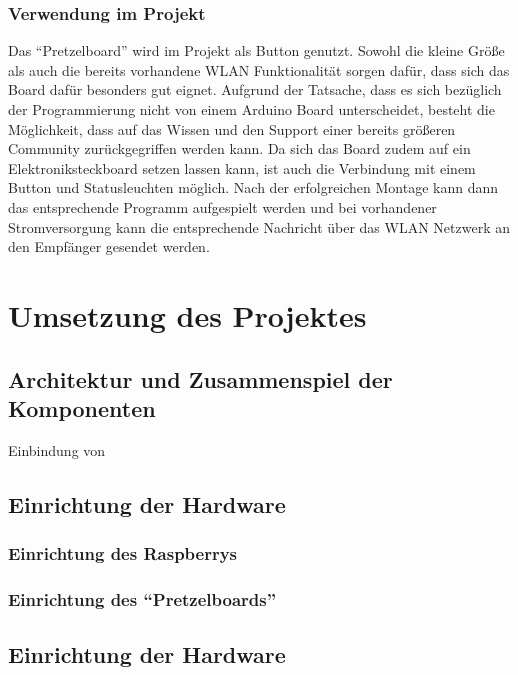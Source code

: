 \documentclass[ngerman]{scrartcl} %
\begin{document}
\subsubsection{Verwendung im Projekt}        
\label{sec:Verwendung des ``Pretzelboard''} 
Das ``Pretzelboard'' wird im Projekt als Button genutzt. Sowohl die kleine Größe als auch die bereits vorhandene WLAN Funktionalität sorgen dafür, dass sich das Board dafür besonders gut eignet. Aufgrund der Tatsache, dass es sich bezüglich der Programmierung nicht von einem Arduino Board unterscheidet, besteht die Möglichkeit, dass auf das Wissen und den Support einer bereits größeren Community zurückgegriffen werden kann. 
Da sich das Board zudem auf ein Elektroniksteckboard setzen lassen kann, ist auch die Verbindung mit einem Button und Statusleuchten möglich. Nach der erfolgreichen Montage kann dann das entsprechende Programm aufgespielt werden und bei vorhandener Stromversorgung kann die entsprechende Nachricht über das WLAN Netzwerk an den Empfänger gesendet werden. 

\newpage

\section{Umsetzung des Projektes}        
\label{sec:Umsetzung des Projektes-1}  

\subsection{Architektur und Zusammenspiel der Komponenten}        
\label{sec:Architektur und Zusammenspiel der Komponenten-1} 

Einbindung von 

\subsection{Einrichtung der Hardware}  
\label{sec:Einrichtung der Hardware-1} 

\subsubsection{Einrichtung des Raspberrys}  
\label{sec:Einrichtung des Raspberrys-1}

\subsubsection{Einrichtung des ``Pretzelboards''}  
\label{sec:Einrichtung des ``Pretzelboards''-1}

\subsection{Einrichtung der Hardware}  
\label{sec:Einrichtung der Hardware-1} 





\listoffigures

 
\end{document}
